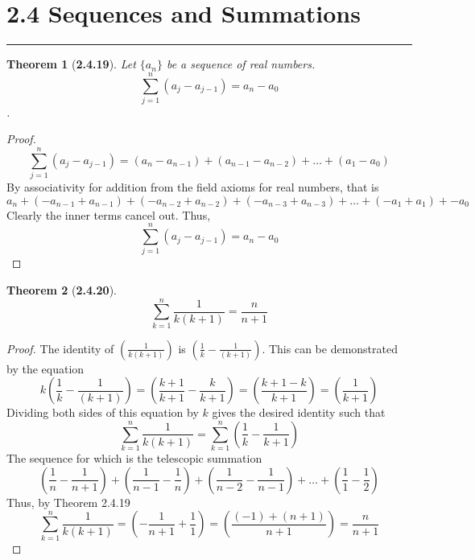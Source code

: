 \documentclass[a4paper, 12pt]{article}
\theoremstyle{plain}
\newtheorem*{theorem*}{Theorem}
\begin{document}
\section*{2.4 Sequences and Summations}
\begin{center}
    \rule{5.4in}{1pt}
\end{center}


\begin{theorem*}[\textbf{2.4.19}]
    Let $\{a_n\}$ be a sequence of real numbers.
    $$\sum_{j=1}^{n} (a_j - a_{j-1}) = a_n - a_0$$.
\end{theorem*}

\begin{proof}
    $$\sum_{j=1}^n (a_j - a_{j-1}) =
    (a_n - a_{n-1}) + (a_{n-1} - a_{n-2}) + \dots + (a_1 - a_0)$$ 
    By associativity for addition from the field axioms for real numbers, that is 
    $$a_n + (-a_{n-1} + a_{n-1}) + (-a_{n-2} + a_{n-2}) + (-a_{n-3} + a_{n-3}) + 
    \dots + (-a_1 + a_1) + -a_0$$ 
    Clearly the inner terms cancel out. Thus, 
    $$\sum_{j=1}^{n} (a_j - a_{j-1}) = a_n - a_0$$
\end{proof}

\pagebreak


\begin{theorem*}[\textbf{2.4.20}]
    $$\sum_{k=1}^{n} \frac{1}{k(k+1)} = \frac{n}{n+1}$$
\end{theorem*}

\begin{proof}
    The identity of $\left(\frac{1}{k(k+1)}\right)$ is 
    $\left(\frac{1}{k} - \frac{1}{(k+1)}\right)$. This can be 
    demonstrated by the equation  
    $$k\left(\frac{1}{k} - \frac{1}{(k+1)}\right) = \left(\frac{k+1}{k+1} - \frac{k}{k+1}\right)
    = \left(\frac{k + 1 - k}{k+1}\right) = \left(\frac{1}{k+1}\right)$$ Dividing both sides of this equation by $k$ gives the desired
    identity such that
    $$\sum_{k=1}^n \frac{1}{k(k+1)} = \sum_{k=1}^{n} \left(\frac{1}{k} - \frac{1}{k+1}\right)$$
    The sequence for which is the telescopic summation
    $$\left(\frac{1}{n} - \frac{1}{n+1}\right) + \left(\frac{1}{n-1} - \frac{1}{n}\right) + 
    \left(\frac{1}{n-2} - \frac{1}{n-1}\right) + \dots + \left(\frac{1}{1} - \frac{1}{2}\right)$$ 
    Thus, by Theorem 2.4.19
    $$\sum_{k=1}^{n} \frac{1}{k(k+1)} = \left(-\frac{1}{n+1} + \frac{1}{1}\right) = \left(\frac{(-1) + (n+1)}{n+1}\right) = \frac{n}{n+1}$$
\end{proof}
\end{document}
